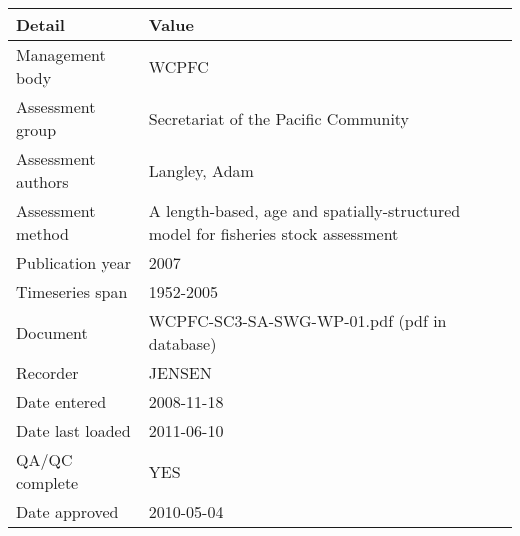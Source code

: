 \begin{table}[htb]
\centering
\begin{tabular}{lp{7cm}}
\toprule
Detail & Value \\
\midrule
Management body    & WCPFC                                                                             \\
Assessment group   & Secretariat of the Pacific Community                                              \\
Assessment authors & Langley, Adam                                                                     \\
Assessment method  & A length-based, age and spatially-structured model for fisheries stock assessment \\
Publication year   & 2007                                                                              \\
Timeseries span    & 1952-2005                                                                         \\
Document           & WCPFC-SC3-SA-SWG-WP-01.pdf (pdf in database)                                      \\
Recorder           & JENSEN                                                                            \\
Date entered       & 2008-11-18                                                                        \\
Date last loaded   & 2011-06-10                                                                        \\
QA/QC complete     & YES                                                                               \\
Date approved      & 2010-05-04                                                                        \\
\bottomrule
\end{tabular}
\label{tab:assessdet}
\end{table}
